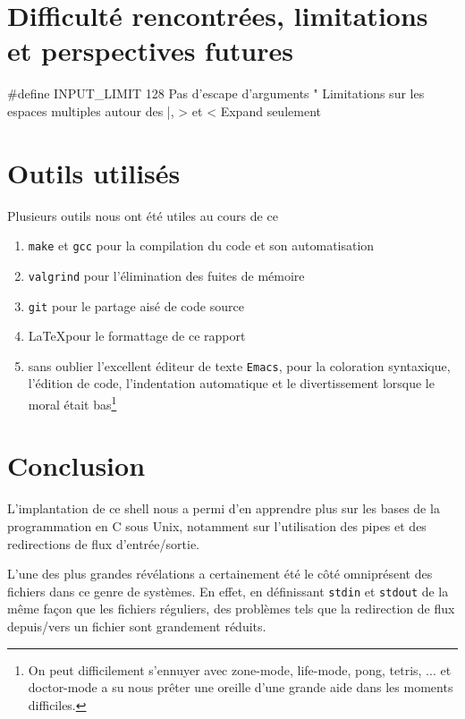\documentclass{article}
\begin{document}
\section{Difficulté rencontrées, limitations et perspectives futures}

\#define INPUT\_LIMIT 128
Pas d'escape d'arguments "
Limitations sur les espaces multiples autour des |, > et <
Expand seulement

\newpage

\section{Outils utilisés}

Plusieurs outils nous ont été utiles au cours de ce

\begin{enumerate}
\item \texttt{make} et \texttt{gcc} pour la compilation du code et son automatisation
\item \texttt{valgrind} pour l'élimination des fuites de mémoire
\item \texttt{git} pour le partage aisé de code source
\item \LaTeX pour le formattage de ce rapport
\item sans oublier l'excellent éditeur de texte \texttt{Emacs}, pour la coloration syntaxique, l'édition de code, l'indentation automatique et le divertissement lorsque le moral était bas\footnote{On peut difficilement s'ennuyer avec zone-mode, life-mode, pong, tetris, ... et doctor-mode a su nous prêter une oreille d'une grande aide dans les moments difficiles.}
\end{enumerate}

\section{Conclusion}

L'implantation de ce shell nous a permi d'en apprendre plus sur les bases de la programmation en C sous Unix, notamment sur l'utilisation des pipes et des redirections de flux d'entrée/sortie.

L'une des plus grandes révélations a certainement été le côté omniprésent des fichiers dans ce genre de systèmes. En effet, en définissant \texttt{stdin} et \texttt{stdout} de la même façon que les fichiers réguliers, des problèmes tels que la redirection de flux depuis/vers un fichier sont grandement réduits.
\end{document}
